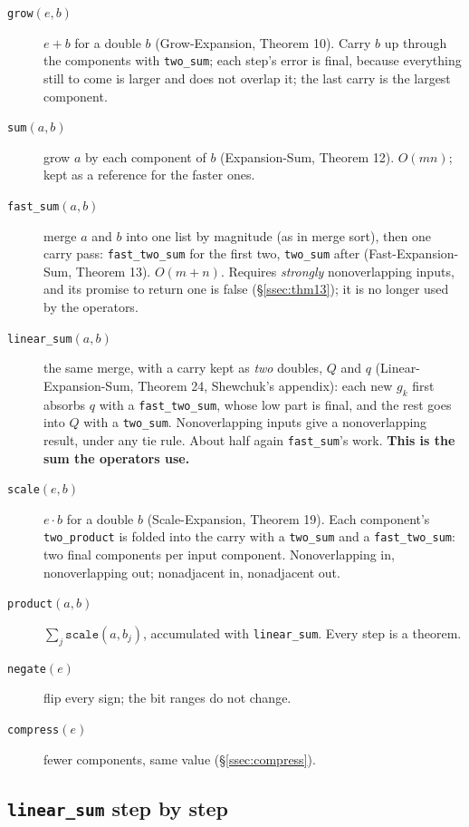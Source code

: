 \documentclass[11pt,a4paper]{article}
\newcommand{\code}[1]{\texttt{#1}}
\newcommand{\secref}[1]{\S\ref{#1}}
\theoremstyle{definition}
\theoremstyle{remark}
\begin{document}
\begin{description}
  \item[\code{grow}$(e, b)$] $e + b$ for a double $b$ (Grow-Expansion, Theorem 10). Carry $b$ up
    through the components with \code{two\_sum}; each step's error is final, because everything
    still to come is larger and does not overlap it; the last carry is the largest component.
  \item[\code{sum}$(a, b)$] grow $a$ by each component of $b$ (Expansion-Sum, Theorem 12).
    $O(mn)$; kept as a reference for the faster ones.
  \item[\code{fast\_sum}$(a, b)$] merge $a$ and $b$ into one list by magnitude (as in merge
    sort), then one carry pass: \code{fast\_two\_sum} for the first two, \code{two\_sum} after
    (Fast-Expansion-Sum, Theorem 13). $O(m+n)$. Requires \emph{strongly} nonoverlapping inputs,
    and its promise to return one is false (\secref{ssec:thm13}); it is no longer used by the
    operators.
  \item[\code{linear\_sum}$(a, b)$] the same merge, with a carry kept as \emph{two} doubles, $Q$
    and $q$ (Linear-Expansion-Sum, Theorem 24, Shewchuk's appendix): each new $g_k$ first absorbs
    $q$ with a \code{fast\_two\_sum}, whose low part is final, and the rest goes into $Q$ with a
    \code{two\_sum}. Nonoverlapping inputs give a nonoverlapping result, under any tie rule.
    About half again \code{fast\_sum}'s work. \textbf{This is the sum the operators use.}
  \item[\code{scale}$(e, b)$] $e\cdot b$ for a double $b$ (Scale-Expansion, Theorem 19). Each
    component's \code{two\_product} is folded into the carry with a \code{two\_sum} and a
    \code{fast\_two\_sum}: two final components per input component. Nonoverlapping in,
    nonoverlapping out; nonadjacent in, nonadjacent out.
  \item[\code{product}$(a, b)$] $\sum_j \code{scale}(a, b_j)$, accumulated with
    \code{linear\_sum}. Every step is a theorem.
  \item[\code{negate}$(e)$] flip every sign; the bit ranges do not change.
  \item[\code{compress}$(e)$] fewer components, same value (\secref{ssec:compress}).
\end{description}

\subsection{\texorpdfstring{\code{linear\_sum}}{linear\_sum} step by step}
\end{document}
